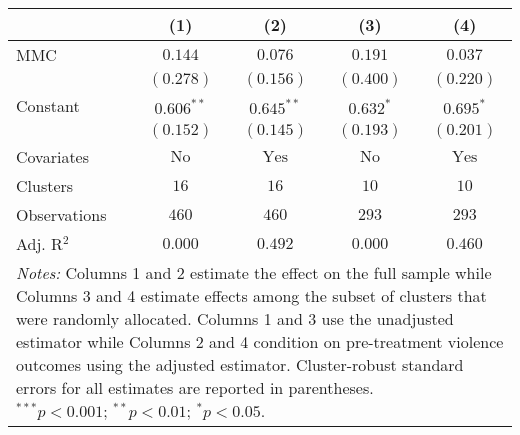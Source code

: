 
\begin{tabular}{l c c c c}
\toprule
 & (1) & (2) & (3) & (4) \\
\midrule
MMC          & $0.144$       & $0.076$        & $0.191$       & $0.037$        \\
             & $(0.278)$     & $(0.156)$      & $(0.400)$     & $(0.220)$      \\
Constant     & $0.606^{**}$  & $0.645^{**}$   & $0.632^{*}$   & $0.695^{*}$    \\
             & $(0.152)$     & $(0.145)$      & $(0.193)$     & $(0.201)$      \\
\midrule
Covariates   & $\textrm{No}$ & $\textrm{Yes}$ & $\textrm{No}$ & $\textrm{Yes}$ \\
Clusters     & $16$          & $16$           & $10$          & $10$           \\
Observations & $460$         & $460$          & $293$         & $293$          \\
Adj. R$^2$   & $0.000$       & $0.492$        & $0.000$       & $0.460$        \\
\bottomrule
\multicolumn{5}{l}{\scriptsize{\parbox{.5\linewidth}{\vspace{2pt} 
       \textit{Notes:} Columns 1 and 2 estimate the effect on the full sample while Columns 3 
       and 4 estimate effects among the subset of clusters that were randomly allocated.
       Columns 1 and 3 use the unadjusted estimator while Columns 2 and 4 condition on 
       pre-treatment violence outcomes using the adjusted estimator. Cluster-robust 
       standard errors for all estimates are reported in parentheses. \\ $^{***}p<0.001$; $^{**}p<0.01$; $^{*}p<0.05$.}}}
\end{tabular}
